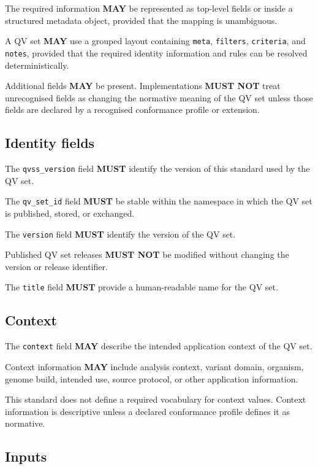 \documentclass[11pt,a4paper]{article}
\begin{document}
The required information \textbf{MAY} be represented as top-level fields or inside a structured metadata object, provided that the mapping is unambiguous.

A QV set \textbf{MAY} use a grouped layout containing \texttt{meta}, \texttt{filters}, \texttt{criteria}, and \texttt{notes}, provided that the required identity information and rules can be resolved deterministically.

Additional fields \textbf{MAY} be present. Implementations \textbf{MUST NOT} treat unrecognised fields as changing the normative meaning of the QV set unless those fields are declared by a recognised conformance profile or extension.

\subsection{Identity fields}

The \texttt{qvss\_version} field \textbf{MUST} identify the version of this standard used by the QV set.

The \texttt{qv\_set\_id} field \textbf{MUST} be stable within the namespace in which the QV set is published, stored, or exchanged.

The \texttt{version} field \textbf{MUST} identify the version of the QV set.

Published QV set releases \textbf{MUST NOT} be modified without changing the version or release identifier.

The \texttt{title} field \textbf{MUST} provide a human-readable name for the QV set.

\subsection{Context}

The \texttt{context} field \textbf{MAY} describe the intended application context of the QV set.

Context information \textbf{MAY} include analysis context, variant domain, organism, genome build, intended use, source protocol, or other application information.

This standard does not define a required vocabulary for context values. Context information is descriptive unless a declared conformance profile defines it as normative.

\subsection{Inputs}
\end{document}
